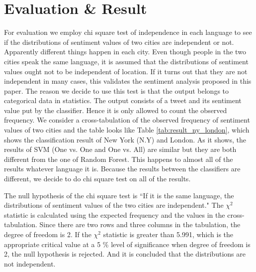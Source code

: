 \documentclass[twocolumn]{article}
\begin{document}
\section{Evaluation \& Result}
\vspace{-2mm}
For evaluation we employ chi square test of independence in each language to see if the distributions of sentiment values of two cities are independent or not. 
Apparently different things happen in each city.
Even though people in the two cities speak the same language, it is assumed that the distributions of sentiment values ought not to be independent of location.  
If it turns out that they are not independent in many cases, this validates the sentiment analysis proposed in this paper.
The reason we decide to use this test is that the output belongs to categorical data in statistics.
The output consists of a tweet and its sentiment value put by the classifier.
Hence it is only allowed to count the observed frequency.
We consider a cross-tabulation of the observed frequency of sentiment values of two cities and the table looks like Table \ref{tab:result_ny_london}, which shows the classification result of New York (N.Y) and London.
As it shows, the results of SVM (One vs. One and One vs. All) are similar but they are both different from the one of Random Forest.
This happens to almost all of the results whatever language it is.
Because the results between the classifiers are different, we decide to do chi square test on all of the results.

The null hypothesis of the chi square test is ``If it is the same language, the distributions of sentiment values of the two cities are independent."
The $\chi^2$ statistic is calculated using the expected frequency and the values in the cross-tabulation.
Since there are two rows and three columns in the tabulation, the degree of freedom is 2.
If the $\chi^2$ statistic is greater than 5.991, which is the appropriate critical value at a 5 \% level of significance when degree of freedom is 2, the null hypothesis is rejected.
And it is concluded that the distributions are not independent. 
\end{document}
